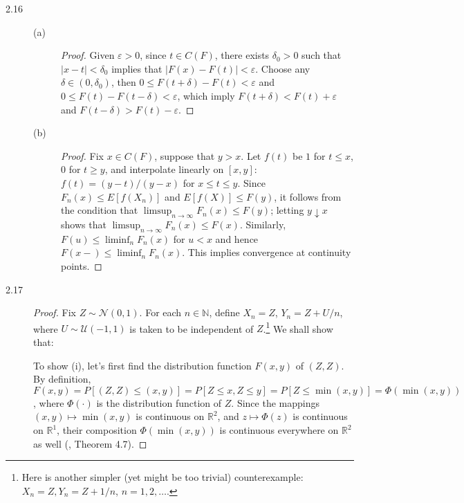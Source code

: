 \documentclass{article}
\newcommand{\eps}{\varepsilon}
\newcommand{\real}{\mathbb{R}}
\newcommand{\nn}{\mathbb{N}}
\newcommand{\gaussian}{\mathcal{N}}
\theoremstyle{definition}
\theoremstyle{plain}
\theoremstyle{remark}
\begin{document}
\begin{description}
\item[2.16]
\begin{description}
\item[(a)]
\begin{proof}
Given $\eps > 0$, since $t \in C(F)$, there exists $\delta_0 > 0$ such that $|x - t| < \delta_0$ implies that $|F(x) - F(t)| < \eps$. 
Choose any $\delta \in (0, \delta_0)$, then $0 \leq F(t + \delta) - F(t) < \eps$ and $0 \leq F(t) - F(t - \delta) < \eps$, which imply $F(t + \delta) < F(t) + \eps$ and $F(t - \delta) > F(t) - \eps$.
\end{proof}

\item[(b)]
\begin{proof}
Fix $x \in C(F)$, suppose that $y > x$. Let $f(t)$ be $1$ for $t \leq x$, $0$ for $t \geq y$, and interpolate linearly on $[x, y]$: $f(t) = (y - t)/(y - x)$ for $x \leq t \leq y$. Since $F_n(x) \leq E[f(X_n)]$ and $E[f(X)] \leq F(y)$, it follows from the condition that $\limsup_{n \to \infty} F_n(x) \leq F(y)$; letting $y \downarrow x$ shows that $\limsup_{n \to \infty} F_n(x) \leq F(x)$. Similarly, $F(u) \leq \liminf_n F_n(x)$ for $u < x$ and hence $F(x-) \leq \liminf_n F_n(x)$. This implies convergence at continuity points. 
\end{proof}
\end{description}

\item[2.17]
\begin{proof}
Fix $Z \sim \gaussian(0, 1)$. For each $n \in \nn$, define $X_n = Z$, 
$Y_n = Z + U/n$, where $U \sim \mathcal{U}(-1, 1)$ is taken to be independent
of $Z$.\footnote{Here is another simpler (yet might be too trivial) counterexample: $X_n = Z, Y_n = Z + 1/n$, $n = 1, 2, \ldots$.} We shall show that:

To show (i), let's first find the distribution function $F(x, y)$ of $(Z, Z)$.
By definition, $F(x, y) = P[(Z, Z) \leq (x, y)] = P[Z \leq x, Z \leq y] = 
P[Z \leq \min(x, y)] = \Phi(\min(x, y))$, where $\Phi(\cdot)$ is the 
distribution function of $Z$. Since the mappings $(x, y) \mapsto \min(x, y)$
is continuous on $\real^2$, and $z \mapsto \Phi(z)$ is continuous on $\real^1$,
their composition $\Phi(\min(x, y))$ is continuous everywhere on $\real^2$
as well (\cite{rudin1964}, Theorem 4.7). 


\end{proof}
\end{description}
\end{document}
